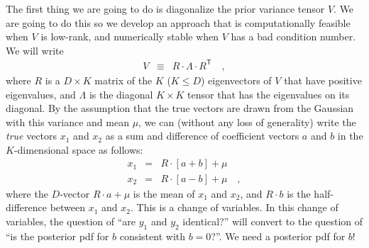 \documentclass[12pt,letterpaper]{article}
\newcommand{\transpose}[1]{{#1}^{\mathsf{T}}}
\begin{document}
The first thing we are going to do is diagonalize the prior variance
tensor $V$. We are going to do this so we develop an approach that is
computationally feasible when $V$ is low-rank, and numerically stable
when $V$ has a bad condition number. We will write
\begin{eqnarray}
V &\equiv& R\cdot\Lambda\cdot\transpose{R} \quad ,
\end{eqnarray}
where $R$ is a $D\times K$ matrix of the $K$ ($K\leq D$) eigenvectors
of $V$ that have positive eigenvalues, and $\Lambda$ is the diagonal
$K\times K$ tensor that has the eigenvalues on its diagonal. By the
assumption that the true vectors are drawn from the Gaussian with this
variance and mean $\mu$, we can (without any loss of generality) write
the \emph{true} vectors $x_1$ and $x_2$ as a sum and difference of
coefficient vectors $a$ and $b$ in the $K$-dimensional space as
follows:
\begin{eqnarray}
x_1 &=& R\cdot[a + b] + \mu \\
x_2 &=& R\cdot[a - b] + \mu \quad ,
\end{eqnarray}
where the $D$-vector $R\cdot a + \mu$ is the mean of $x_1$ and $x_2$,
and $R\cdot b$ is the half-difference between $x_1$ and $x_2$. This is
a change of variables.  In this change of variables, the question of
``are $y_1$ and $y_2$ identical?'' will convert to the question of
``is the posterior pdf for $b$ consistent with $b=0$?''. We need a
posterior pdf for $b$!
\end{document}
